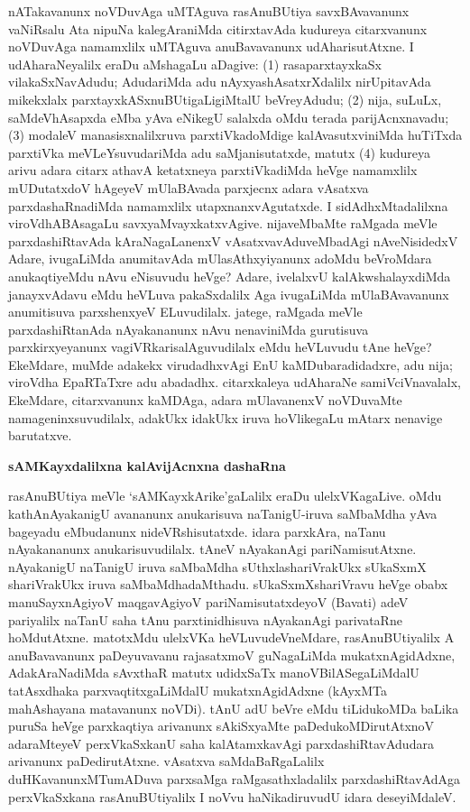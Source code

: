 nATakavanunx noVDuvAga uMTAguva rasAnuBUtiya savxBAvavanunx vaNiR\-salu Ata nipuNa kalegAraniMda citirxtavAda kudureya citarxvanunx noVDuvAga namamxlilx uMTAguva anuBavavanunx udAharisutAtxne. I udAharaNeyalilx eraDu aMsha\-gaLu aDagive: (1) rasaparxtayxkaSx vilakaSxNavAdudu; AdudariMda adu nAyxyashAsatxrXdalilx nirUpitavAda mikekxlalx parxtayxkASxnuBUtigaLigiMtalU beVreyAdudu; (2) nija, \hbox{suLuLx}, saMdeVhAsapxda eMba yAva eNikegU salalxda oMdu terada parijAcnxnavadu;\break (3) modaleV manasisxnalilxruva parxtiVkadoMdige kalAvasutxviniMda huTiTxda parxtiVka meVLeYsuvudariMda adu saMjanisutatxde, matutx (4) kudureya arivu adara citarx athavA ketatxneya parxtiVkadiMda heVge namamxlilx mUDutatxdoV hAgeyeV mUlaBAvada parxjecnx adara vAsatxva parxdashaRnadiMda namamxlilx utapxnanxvAgutatxde. I sidAdhxMtadalilxna viroVdhABAsagaLu savxyaM\-vayxkatxvAgive. nijaveMbaMte raMgada meVle parxdashiRtavAda kAraNa\-gaLanenxV vAsatxvavAdu\-veMbadAgi nAveNisidedxV Adare, ivugaLiMda anumitavAda mUla\-sAthxyi\-yanunx adoMdu beVroMdara anukaqtiyeMdu nAvu eNisuvudu heVge? Adare, ive\-lalxvU kalAkwshalayxdiMda janayxvAdavu eMdu heVLuva pakaSxdalilx Aga ivugaLiMda mUla\-BAvavanunx anumitisuva parxshenxyeV ELuvudilalx. jatege, raMgada meVle parxdashiRtanAda nAyakananunx nAvu nenaviniMda gurutisuva parxkirxyeyanunx vagiVRkarisa\-lAguvudilalx eMdu heVLuvudu tAne heVge? EkeMdare, muMde adakekx virudadhxvAgi EnU kaMDu\-baradidadxre, adu nija; viroVdha EpaRTaTxre adu abadadhx. citarxkaleya udAharaNe samiVciVnavalalx, EkeMdare, citarxvanunx kaMDAga, adara mUlavanenxV noVDuvaMte nama\-geninxsuvudilalx, adakUkx idakUkx iruva hoVlikegaLu mAtarx nenavige barutatxve.

\smallskip
\begin{center}
{\Large\bf sAMKayxdalilxna kalAvijAcnxna dashaRna}
\end{center}

rasAnuBUtiya meVle `sAMKayxkArike'gaLalilx eraDu ulelxVKagaLive. oMdu kathA\-nAyakanigU avananunx anukarisuva naTanigU-iruva saMbaMdha yAva bageyadu eMbudanunx nideVRshisutatxde. idara parxkAra, naTanu nAyakananunx anukarisuvu\-dilalx. tAneV nAyakanAgi pariNamisutAtxne. nAyakanigU naTanigU iruva saMbaMdha sUthxla\-shariVrakUkx sUkaSxmX shariVrakUkx iruva saMbaMdhadaMthadu. sUkaSxmXshariVravu heVge obabx manuSayxnAgiyoV maqgavAgiyoV pariNamisutatxdeyoV (Bavati) adeV pariyalilx naTanU saha tAnu parxtinidhisuva nAyakanAgi parivataRne hoMdutAtxne. matotxMdu ulelxVKa heVLuvudeVneMdare, rasAnuBUtiyalilx A anuBavavanunx paDeyuvavanu rajasatxmoV guNagaLiMda mukatxnAgidAdxne, AdakAraNadiMda sAvxthaR matutx udidxSaTx manoVBilASegaLiMdalU tatAsxdhaka parxvaqtitxgaLiMdalU mukatxnAgidAdxne (kAyxMTa mahAshayana matavanunx noVDi). tAnU adU beVre eMdu tiLidukoMDa baLika puruSa heVge parxkaqtiya arivanunx sAkiSxyaMte paDedukoMDirutAtxnoV adaraMteyeV perxVkaSxkanU saha kalAtamxkavAgi parxdashiRtavAdudara arivanunx paDedirutAtxne. vAsatxva saMdaBaRgaLalilx duHKavanunxMTumADuva parxsaMga raMgasathxladalilx parxdashiRtavAdAga perxVkaSxkana rasAnuBUtiyalilx I noVvu haNikadiruvudU idara deseyiMdaleV.

